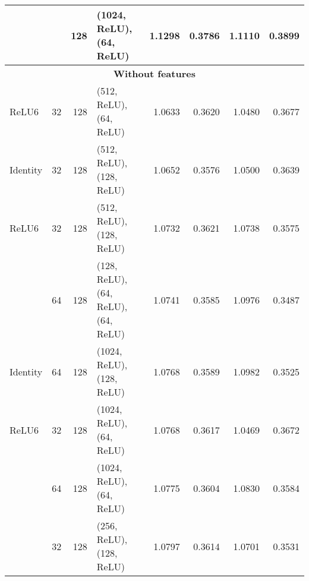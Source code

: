 \begin{table}
\begin{tabular}{lrrp{3.5cm}rrrr}
           &    & 128 & (1024, ReLU), (64, ReLU) &  1.1298 &      0.3786 &   1.1110 &        0.3899 \\
           \midrule
\multicolumn{8}{c}{\textbf{Without features}}\\\addlinespace
ReLU6 & 32  & 128 & (512, ReLU), (64, ReLU) &  1.0633 &      0.3620 &   1.0480 &        0.3677 \\
Identity & 32  & 128 & (512, ReLU), (128, ReLU) &  1.0652 &      0.3576 &   1.0500 &        0.3639 \\
ReLU6 & 32  & 128 & (512, ReLU), (128, ReLU) &  1.0732 &      0.3621 &   1.0738 &        0.3575 \\
                 & 64  & 128 & (128, ReLU), (64, ReLU), (64, ReLU) &  1.0741 &      0.3585 &   1.0976 &        0.3487 \\
Identity & 64  & 128 & (1024, ReLU), (128, ReLU) &  1.0768 &      0.3589 &   1.0982 &        0.3525 \\
ReLU6 & 32  & 128 & (1024, ReLU), (64, ReLU) &  1.0768 &      0.3617 &   1.0469 &        0.3672 \\
                 & 64  & 128 & (1024, ReLU), (64, ReLU) &  1.0775 &      0.3604 &   1.0830 &        0.3584 \\
                 & 32  & 128 & (256, ReLU), (128, ReLU) &  1.0797 &      0.3614 &   1.0701 &        0.3531 \\

\bottomrule
\end{tabular}
\end{table}
